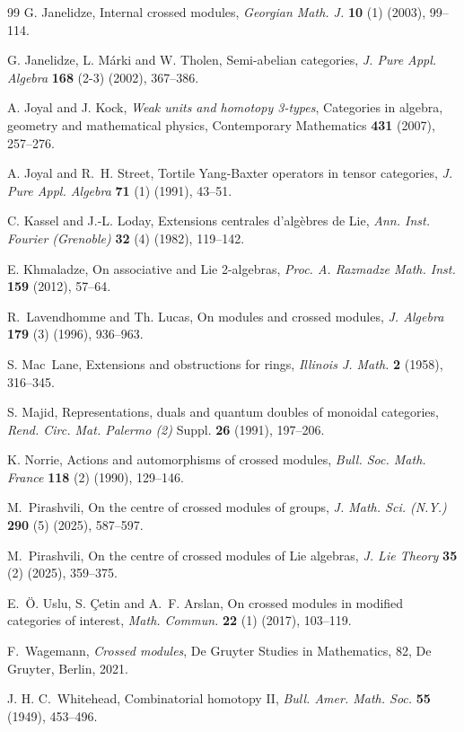 \documentclass[12pt,reqno]{amsart}
\theoremstyle{plain}
\theoremstyle{definition}
\theoremstyle{remark}
\numberwithin{equation}{section}
\begin{document}
\begin{thebibliography}{99}
 G. Janelidze, Internal crossed modules, \emph{Georgian Math. J.} \textbf{10} (1) (2003), 99--114.

   G. Janelidze, L. M\'arki and W. Tholen, Semi-abelian categories, \emph{J. Pure Appl. Algebra} \textbf{168} (2-3) (2002),  367--386.
  
  A. Joyal and J. Kock, \emph{Weak units and homotopy 3-types}, Categories in algebra, geometry and mathematical physics, Contemporary Mathematics \textbf{431}  (2007),  257--276.
  
  A. Joyal and R.~H. Street, Tortile Yang-Baxter operators in tensor categories, \emph{J. Pure Appl. Algebra} \textbf{71} (1) (1991),  43--51.
  
  C. Kassel and J.-L. Loday, Extensions centrales d'alg\`ebres de Lie, \emph{Ann. Inst. Fourier (Grenoble)} \textbf{32} (4) (1982),  119--142. 

 E. Khmaladze, On associative and Lie 2-algebras, \emph{Proc. A. Razmadze Math. Inst.} \textbf{159} (2012), 57--64.

R.~Lavendhomme  and Th. Lucas,  On modules and crossed modules, \emph{J. Algebra} \textbf{179} (3) (1996),  936--963.

  S. Mac~Lane, Extensions and obstructions for rings, \emph{Illinois J. Math.} \textbf{2} (1958), 316--345.
    
   S. Majid, Representations, duals and quantum doubles of monoidal categories, \emph{Rend. Circ. Mat. Palermo (2)} Suppl.  \textbf{26} (1991), 197--206.
  
K. Norrie, Actions and automorphisms of crossed modules, \emph{Bull. Soc. Math. France} \textbf{118} (2) (1990),  129--146.

 
   
 M.~Pirashvili, On the centre of crossed modules of groups, \emph{J. Math. Sci. (N.Y.)} \textbf{290} (5) (2025),  587--597. 

  M.~Pirashvili, On the centre of crossed modules of Lie algebras, \emph{J. Lie Theory} \textbf{35} (2) (2025),   359--375.


  
  E.~\"O. Uslu, S. \c Cetin and A.~F. Arslan, On crossed modules in modified categories of interest, \emph{Math. Commun.} \textbf{22} (1) (2017), 103--119.
  
  F.~Wagemann, \emph{Crossed modules}, De Gruyter Studies in Mathematics, 82, De Gruyter, Berlin, 2021. 
  
  J. H. C.~Whitehead, Combinatorial homotopy II, \emph{Bull. Amer. Math. Soc.} \textbf{55} (1949), 453--496.

 \end{thebibliography}
\end{document}

